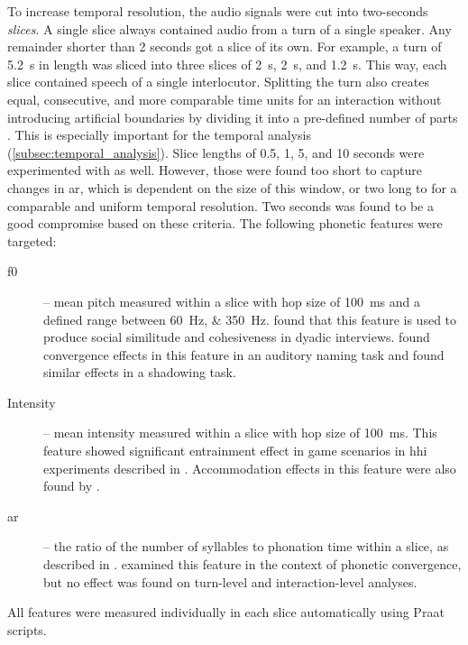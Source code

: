 To increase temporal resolution, the audio signals were cut into two-seconds \emph{slices}.
A single slice always contained audio from a turn of a single speaker.
Any remainder shorter than \si{2} seconds got a slice of its own.
For example, a turn of \SI{5.2}{\second} in length was sliced into three slices of \SI{2}{\second}, \SI{2}{\second}, and \SI{1.2}{\second}.
This way, each slice contained speech of a single interlocutor.
Splitting the turn also creates equal, consecutive, and more comparable time units for an interaction without introducing artificial boundaries by dividing it into a pre-defined number of parts \citep[as in][]{Silber-Varod2018prosodic}.
This is especially important for the temporal analysis (\cref{subsec:temporal_analysis}).
Slice lengths of 0.5, 1, 5, and 10 seconds were experimented with as well.
However, those were found too short to capture changes in \ac{ar}, which is dependent on the size of this window, or two long to for a comparable and uniform temporal resolution.
Two seconds was found to be a good compromise based on these criteria.
%
The following phonetic features were targeted: 
%
\begin{description}%
	\item[\Acf{f0}] -- mean pitch measured within a slice with hop size of \SI{100}{\milli\second} and a defined range between \SIlist{60;350}{\hertz}.
	\citet{Gregory1993Voice} found that this feature is used to produce social similitude and cohesiveness in dyadic interviews.
	\citet{Babel2012role} found convergence effects in this feature in an auditory naming task and \citet{Bulatov2009effect} found similar effects in a shadowing task.
	
	\item[Intensity] -- mean intensity measured within a slice with hop size of \SI{100}{\milli\second}.
	This feature showed significant entrainment effect in game scenarios in \ac{hhi} experiments described in \citet{Levitan2011measuring}.
	Accommodation effects in this feature were also found by \citet{Natale1975convergence}.
	
	\item[\Acf{ar}] -- the ratio of the number of syllables to phonation time within a slice, as described in \citet{DeJong2009arcitulcationrate}.
	\citet{Schweitzer2013convergence} examined this feature in the context of phonetic convergence, but no effect was found on turn-level and interaction-level analyses.
\end{description}
%
All features were measured individually in each slice automatically using Praat \citep{Boersma2001praat} scripts.

